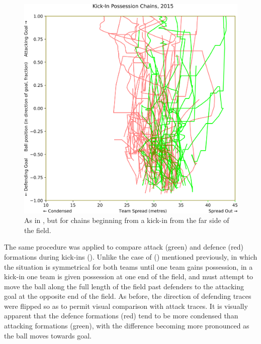 \begin{figure}[!htb]
\centering
\includegraphics[width=\linewidth]{figs/paper/ki-spread-cmp-attack-and-defense.png}
\caption{As in , but for chains beginning from a kick-in from the far side of the field.}
\label{fig:ki-spread-cmp-attack-and-defense}
\end{figure}

The same procedure was applied to compare attack (green) and defence (red) formations during kick-ins (). Unlike the case of \centrebounces{} () mentioned previously, in which the situation is symmetrical for both teams until one team gains possession, in a kick-in one team is given possession at one end of the field, and must attempt to move the ball along the full length of the field past defenders to the attacking goal at the opposite end of the field. As before, the direction of defending traces were flipped so as to permit visual comparison with attack traces. It is visually apparent that the defence formations (red) tend to be more condensed than attacking formations (green), with the difference becoming more pronounced as the ball moves towards goal.


